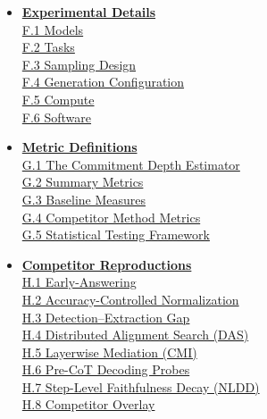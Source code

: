 \documentclass[11pt]{article}
\begin{document}
{\begin{itemize}[itemsep=4pt,topsep=2pt,leftmargin=*]
  \hyperref[app:compile-overview]{E.1 Overview}\\
  \hyperref[app:compile-pertask]{E.2 Per-Task Programs}\\
  \hyperref[app:compile-params]{E.3 Compilation Parameters}\\
  \hyperref[app:compile-precision]{E.4 Precision Analysis}
\item[\textbf{F}] \hyperref[app:exp]{\textbf{Experimental Details}}\\[1pt]
  \hyperref[app:exp-models]{F.1 Models}\\
  \hyperref[app:exp-tasks]{F.2 Tasks}\\
  \hyperref[app:exp-sampling]{F.3 Sampling Design}\\
  \hyperref[app:exp-generation]{F.4 Generation Configuration}\\
  \hyperref[app:exp-compute]{F.5 Compute}\\
  \hyperref[app:exp-software]{F.6 Software}
\item[\textbf{G}] \hyperref[app:metrics]{\textbf{Metric Definitions}}\\[1pt]
  \hyperref[app:metrics-estimator]{G.1 The Commitment Depth Estimator}\\
  \hyperref[app:metrics-summary]{G.2 Summary Metrics}\\
  \hyperref[app:metrics-baselines]{G.3 Baseline Measures}\\
  \hyperref[app:metrics-competitors]{G.4 Competitor Method Metrics}\\
  \hyperref[app:metrics-stats]{G.5 Statistical Testing Framework}
\item[\textbf{H}] \hyperref[app:competitors]{\textbf{Competitor Reproductions}}\\[1pt]
  \hyperref[app:competitors-ea]{H.1 Early-Answering}\\
  \hyperref[app:competitors-ac]{H.2 Accuracy-Controlled Normalization}\\
  \hyperref[app:competitors-de]{H.3 Detection--Extraction Gap}\\
  \hyperref[app:competitors-das]{H.4 Distributed Alignment Search (DAS)}\\
  \hyperref[app:competitors-cmi]{H.5 Layerwise Mediation (CMI)}\\
  \hyperref[app:competitors-precot]{H.6 Pre-CoT Decoding Probes}\\
  \hyperref[app:competitors-nldd]{H.7 Step-Level Faithfulness Decay (NLDD)}\\
  \hyperref[app:competitors-overlay]{H.8 Competitor Overlay}\\

\end{itemize}}
\end{document}
